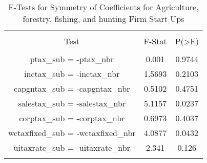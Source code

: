 
\begin{table}[!htbp] \centering 
  \caption{F-Tests for Symmetry of Coefficients for Agriculture, forestry, fishing, and hunting Firm Start Ups} 
  \label{11Ftests} 
\begin{tabular}{@{\extracolsep{5pt}} ccc} 
\\[-1.8ex]\hline 
\hline \\[-1.8ex] 
Test & F-Stat & P(\textgreater F) \\ 
\hline \\[-1.8ex] 
ptax\_sub = -ptax\_nbr & 0.001 & 0.9744 \\ 
inctax\_sub = -inctax\_nbr & 1.5693 & 0.2103 \\ 
capgntax\_sub = -capgntax\_nbr & 0.5102 & 0.4751 \\ 
salestax\_sub = -salestax\_nbr & 5.1157 & 0.0237 \\ 
corptax\_sub = -corptax\_nbr & 0.6973 & 0.4037 \\ 
wctaxfixed\_sub = -wctaxfixed\_nbr & 4.0877 & 0.0432 \\ 
uitaxrate\_sub = -uitaxrate\_nbr & 2.341 & 0.126 \\ 
\hline \\[-1.8ex] 
\end{tabular} 
\end{table} 

